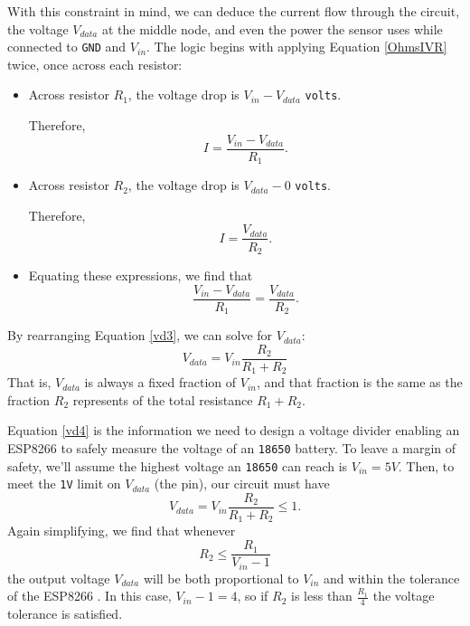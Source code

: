 With this constraint in mind, we can deduce the current flow through the circuit, the voltage $V_{data}$ at the middle node, and even the power the sensor uses while connected to \texttt{GND} and $V_{in}$.
The logic begins with applying Equation \ref{OhmsIVR} twice, once across each resistor:
\begin{itemize}
	\item Across resistor $R_1$, the voltage drop is $V_{in}-V_{data}$ \texttt{volts}.
	
	Therefore,
	\begin{equation}\label{vd1}
	I = \frac{V_{in}-V_{data}}{R_1}.
	\end{equation}	
	\item Across resistor $R_2$, the voltage drop is $V_{data}-0$ \texttt{volts}.
	
	Therefore,
	\begin{equation}\label{vd2}
	I = \frac{V_{data}}{R_2}.
	\end{equation}
	\item Equating these expressions, we find that 	
	\begin{equation}\label{vd3}
	\frac{V_{in}-V_{data}}{R_1} = \frac{V_{data}}{R_2}.
	\end{equation}
\end{itemize}
By rearranging Equation \ref{vd3}, we can solve for $V_{data}$:
\begin{equation}\label{vd4}
V_{data} = V_{in} \frac{R_2}{R_1+R_2}
\end{equation}
That is, $V_{data}$ is always a fixed fraction of $V_{in}$, and that fraction is the same as the fraction $R_2$ represents of the total resistance $R_1+R_2$. 

Equation \ref{vd4} is the information we need to design a voltage divider enabling an ESP8266 \adc to safely measure the voltage of an \texttt{18650} battery.
To leave a margin of safety, we'll assume the highest voltage an \texttt{18650} can reach is $V_{in}=5V$. Then, to meet the \texttt{1V} limit on $V_{data}$ (the \adc pin), our circuit must have
\begin{equation}\label{vd5}
V_{data} = V_{in} \frac{R_2}{R_1+R_2}  \le 1 .
\end{equation}
Again simplifying, we find that whenever
\begin{equation}\label{vd6}
R_2 \le \frac{R_1}{V_{in}-1} %
\end{equation}
the output voltage $V_{data}$ will be both proportional to $V_{in}$ and within the tolerance of the ESP8266 \adc.
In this case, $V_{in}-1 = 4$, so if $R_2$ is less than $\frac{R_1}{4}$ the voltage tolerance is satisfied.

